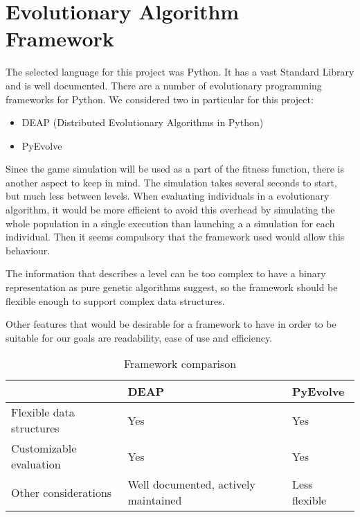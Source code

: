 \chapter{Evolutionary Algorithm Framework}\label{ch:frameworkSelection}

The selected language for this project was Python. It has a vast Standard Library and is well documented. There are a number of evolutionary programming frameworks for Python. We considered two in particular for this project:

\begin{itemize}
	\item DEAP (Distributed Evolutionary Algorithms in Python)\cite{fortin2012deap}
	\item PyEvolve\cite{perone2009pyevolve}
\end{itemize}

Since the game simulation will be used as a part of the fitness function, there is another aspect to keep in mind. The simulation takes several seconds to start, but much less between levels. When evaluating individuals in a evolutionary algorithm, it would be more efficient to avoid this overhead by simulating the whole population in a single execution than launching a a simulation for each individual. Then it seems compulsory that the framework used would allow this behaviour.

The information that describes a level can be too complex to have a binary representation as pure genetic algorithms suggest, so the framework should be flexible enough to support complex data structures. 

Other features that would be desirable for a framework to have in order to be suitable for our goals are readability, ease of use and efficiency.

\begin{table}
	\myfloatalign
	 \begin{tabularx}{\textwidth}{XXX} \toprule
	
		& \textbf{DEAP}&\textbf{PyEvolve}\\ \midrule
		Flexible data \newline structures  & Yes & Yes\\ \midrule
		Customizable \linebreak evaluation & Yes & Yes\\ \midrule
		Other \linebreak considerations & Well documented, \linebreak actively maintained &Less flexible\\ 
	\bottomrule
	\end{tabularx}
\caption{Framework comparison}
\label{t:framework}
\end{table}

